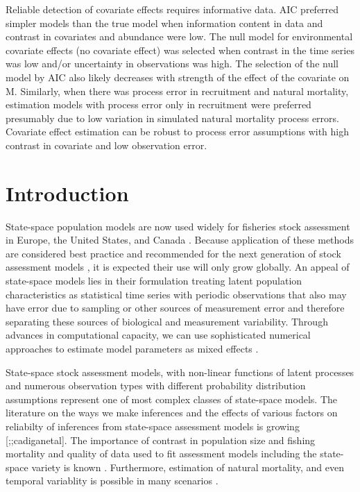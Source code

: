 \documentclass[
  12pt,
]{article}
\begin{document}
Reliable detection of covariate effects requires informative data. AIC preferred simpler models than the true model when information content in data and contrast in covariates and abundance were low. The null model for environmental covariate effects (no covariate effect) was selected when contrast in the time series was low and/or uncertainty in observations was high. The selection of the null model by AIC also likely decreases with strength of the effect of the covariate on M. Similarly, when there was process error in recruitment and natural mortality, estimation models with process error only in recruitment were preferred presumably due to low variation in simulated natural mortality process errors. Covariate effect estimation can be robust to process error assumptions with high contrast in covariate and low observation error.

\pagebreak

\hypertarget{introduction}{%
\section*{Introduction}\label{introduction}}

State-space population models are now used widely for fisheries stock assessment in Europe, the United States, and Canada \citep{nielsenberg14, cadigan16, pedersenberg17, stockmiller21}. Because application of these methods are considered best practice and recommended for the next generation of stock assessment models \citep{hoyleetal22, punt23}, it is expected their use will only grow globally. An appeal of state-space models lies in their formulation treating latent population characteristics as statistical time series with periodic observations that also may have error due to sampling or other sources of measurement error and therefore separating these sources of biological and measurement variability. Through advances in computational capacity, we can use sophisticated numerical approaches to estimate model parameters as mixed effects \citep{thorsonminto15, kristensenetal16}.

State-space stock assessment models, with non-linear functions of latent processes and numerous observation types with different probability distribution assumptions represent one of most complex classes of state-space models. The literature on the ways we make inferences and the effects of various factors on reliabilty of inferences from state-space assessment models is growing {[}\citet{lietal24};\citet{milleretal_inreview1};cadiganetal{]}. The importance of contrast in population size and fishing mortality and quality of data used to fit assessment models including the state-space variety is known \citep{magnussonhilborn07, milleretal_inreview1}. Furthermore, estimation of natural mortality, and even temporal variablity is possible in many scenarios \citep{leeetal11, johnsonetal16, cadigan16, millerhyun18, milleretal_inreview1}.
\end{document}
